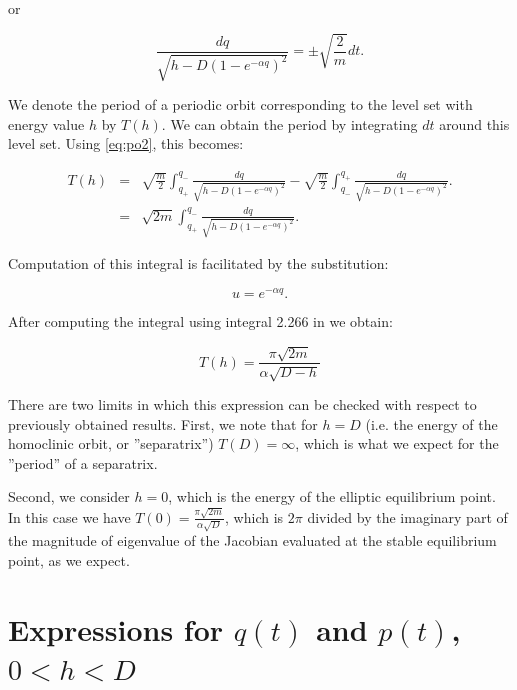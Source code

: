 \documentclass{ws-ijbc}
\begin{document}
\noindent
or

\begin{equation}
\frac{dq}{ \sqrt{h-D \left( 1-e^{-\alpha q} \right)^2}} = \pm \sqrt{\frac{2}{m}} dt.
\label{eq:po2}
\end{equation}

\noindent
We denote the period of a periodic orbit corresponding to the level set with energy value $h$ by $T(h)$. We can obtain the period by integrating $dt$ around this level set.  Using \eqref{eq:po2}, this becomes:



\begin{eqnarray}
T(h) & = & \sqrt{\frac{m}{2}} \int_{q_+}^{q_-} \frac{dq}{ \sqrt{h-D \left( 1-e^{-\alpha q} \right)^2}} -
\sqrt{\frac{m}{2}} \int_{q_-}^{q_+} \frac{dq}{ \sqrt{h-D \left( 1-e^{-\alpha q} \right)^2}}. \nonumber \\
& = & \sqrt{2m}  \int_{q_+}^{q_-} \frac{dq}{ \sqrt{h-D \left( 1-e^{-\alpha q} \right)^2}}.
\label{eq:po3}
\end{eqnarray}

\noindent
Computation of this integral is facilitated by the substitution:

\begin{equation}
u = e^{-\alpha q}.
\label{eq:subs}
\end{equation}

\noindent
After computing the integral using integral 2.266 in \cite{gradshteyn1980table} we obtain:

\begin{equation}
T(h) = \frac{\pi \sqrt{2m}}{\alpha \sqrt{D-h}}
\label{eq:period}
\end{equation}

There are two limits in which this expression can be checked with respect to previously obtained results.
First, we note that for $h=D$ (i.e. the energy of the homoclinic orbit, or ''separatrix'')  $T(D) = \infty$, which is what we expect for the ''period''  of a separatrix.  

Second, we consider $h=0$, which is the energy of the elliptic equilibrium point. In this case we have $T(0) = \frac{\pi \sqrt{2m}}{\alpha \sqrt{D}}$, which is $2 \pi$ divided by the imaginary part of the magnitude of eigenvalue of the Jacobian evaluated at the stable equilibrium point, as we expect. 


\section{Expressions for $q(t)$ and $p(t)$, $0 < h < D$}
\label{sec:traj}
\end{document}
